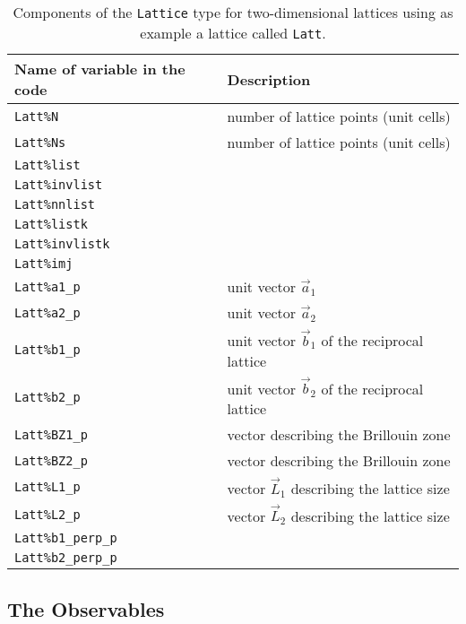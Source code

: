 %
\begin{table}[h]
   \begin{tabular}{l l}
    Name of variable in the code & Description \\\hline
    \texttt{Latt\%N}            &  number of lattice points (unit cells) \\
    \texttt{Latt\%Ns}           &  number of lattice points (unit cells)\\
    \texttt{Latt\%list}         &  \\
     \texttt{Latt\%invlist}     &   \\  
    \texttt{Latt\%nnlist}       &  \\
    \texttt{Latt\%listk}        &  \\
    \texttt{Latt\%invlistk}     &  \\ 
    \texttt{Latt\%imj}          &  \\
    \texttt{Latt\%a1\_p}        & unit vector $\vec{a}_1$ \\
    \texttt{Latt\%a2\_p}        & unit vector $\vec{a}_2$ \\
    \texttt{Latt\%b1\_p}        & unit vector $\vec{b}_1$ of the reciprocal lattice \\
    \texttt{Latt\%b2\_p}        & unit vector $\vec{b}_2$ of the reciprocal lattice \\
    \texttt{Latt\%BZ1\_p}       & vector describing the Brillouin zone\\
    \texttt{Latt\%BZ2\_p}       & vector describing the Brillouin zone\\
    \texttt{Latt\%L1\_p}        & vector $\vec{L}_1$ describing the lattice size\\
    \texttt{Latt\%L2\_p}        & vector $\vec{L}_2$ describing the lattice size\\
    \texttt{Latt\%b1\_perp\_p}  & \\
    \texttt{Latt\%b2\_perp\_p}  &  
   \end{tabular}
   \caption{Components of the \texttt{Lattice} type for two-dimensional lattices using as example a lattice called \texttt{Latt}.
    \label{Operator.type}}
\end{table}
%

\subsection{The Observables}

